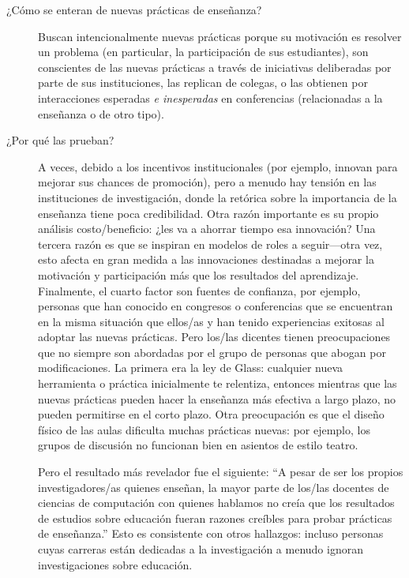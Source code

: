 \begin{description}


\item[¿Cómo se enteran de nuevas prácticas de enseñanza?]

Buscan intencionalmente nuevas prácticas
porque su motivación es  resolver un problema (en particular, la participación de sus estudiantes),
son conscientes de las nuevas prácticas a través de iniciativas deliberadas por parte de sus instituciones,
las replican de colegas,
o las obtienen por interacciones esperadas  \emph{e inesperadas} en conferencias
(relacionadas a la enseñanza o de otro tipo).

\item[¿Por qué las prueban?]

A veces, debido a los incentivos institucionales
(por ejemplo, innovan para mejorar sus chances de promoción),
pero a menudo hay tensión en las instituciones de investigación,
donde la retórica sobre la importancia de la enseñanza tiene poca credibilidad.
Otra razón importante es su propio análisis costo/beneficio:
¿les va a ahorrar tiempo esa innovación?
Una tercera razón es que se inspiran en modelos de roles a seguir---otra vez,
esto afecta en gran medida a las innovaciones destinadas a  mejorar la motivación y participación más que los resultados del aprendizaje.
Finalmente, el cuarto factor son fuentes de confianza,
por ejemplo, personas que han conocido en congresos o conferencias que se encuentran en la misma situación que ellos/as 
y han tenido experiencias exitosas al adoptar las nuevas prácticas.
Pero los/las dicentes tienen preocupaciones que no siempre son abordadas por el grupo de personas que abogan por modificaciones.
La primera era la ley de Glass:
cualquier nueva herramienta o práctica inicialmente te relentiza,
entonces mientras que las nuevas prácticas pueden hacer la enseñanza más efectiva a largo plazo, no pueden permitirse en el corto plazo.
Otra preocupación es que el diseño físico de las aulas dificulta muchas prácticas nuevas:
por ejemplo,
los grupos de discusión no funcionan bien en asientos de estilo teatro.

Pero el resultado más revelador fue el siguiente:
``A pesar de ser los propios investigadores/as quienes enseñan,
la mayor parte de los/las docentes de ciencias de computación con quienes hablamos
no creía que los resultados de estudios sobre educación fueran razones creíbles para probar prácticas de enseñanza.''
Esto es consistente con otros hallazgos:
incluso personas cuyas carreras están dedicadas a la investigación a menudo ignoran investigaciones sobre educación. 


\end{description}

